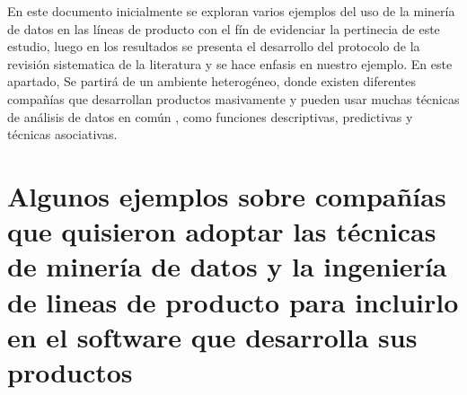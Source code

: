 En este documento inicialmente se exploran varios ejemplos del uso de la minería de datos en las líneas de producto con el fín de evidenciar la pertinecia de este estudio, luego en los resultados se presenta el desarrollo del protocolo de la revisión sistematica de la literatura y se hace enfasis en nuestro ejemplo. En este apartado, Se partirá de un ambiente heterogéneo, donde existen diferentes compañías que desarrollan productos masivamente y pueden usar  muchas técnicas de análisis de datos en común \cite{Thum2014}, como funciones descriptivas, predictivas y técnicas  asociativas. 

\section{Algunos ejemplos sobre  compañías que quisieron adoptar las técnicas de minería de datos y la ingeniería de lineas de producto para incluirlo en el software que desarrolla sus productos} 

